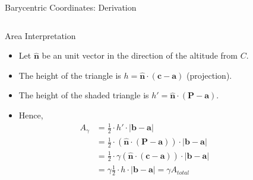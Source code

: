 \begin{frame}{Barycentric Coordinates: Derivation}
    \begin{columns}
        \begin{column}{0.65\textwidth}
            \begin{mathbox}{Area Interpretation}
                \begin{itemize}
                    \small
                    \item  Let $\hat{\mathbf{n}}$ be an unit vector in the direction of the altitude from $C$. 
                    \pause
                    \item  The height of the triangle is $h = \hat{\mathbf{n}} \cdot (\mathbf{c} - \mathbf{a})$ (projection).
                    \pause
                    \item  The height of the shaded triangle is $h' = \hat{\mathbf{n}} \cdot (\mathbf{P} - \mathbf{a})$.
                    \pause
                    \item  Hence, \begin{align*}
                        A_{\gamma} &= \frac{1}{2} \cdot h' \cdot |\mathbf{b} - \mathbf{a}| \\
                        &= \frac{1}{2} \cdot \left (\hat{\mathbf{n}} \cdot (\mathbf{P} - \mathbf{a}) \right ) \cdot |\mathbf{b} - \mathbf{a}|  \\
                        &= \frac{1}{2} \cdot \gamma \left (\hat{\mathbf{n}} \cdot (\mathbf{c} - \mathbf{a}) \right ) \cdot |\mathbf{b} - \mathbf{a}|  \\
                        &= \gamma \frac{1}{2} \cdot h \cdot |\mathbf{b} - \mathbf{a}| = \gamma A_{total}
                    \end{align*}
                \end{itemize}
            \end{mathbox}    
        \end{column}
        \begin{column}{0.35\textwidth}
\end{column}
\end{columns}
\end{frame}
